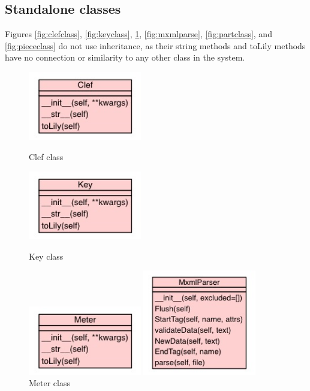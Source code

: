 \begin{appendices}
\subsection{Standalone classes}
Figures \ref{fig:clefclass}, \ref{fig:keyclass}, \ref{fig:meterclass}, \ref{fig:mxmlparse}, \ref{fig:partclass}, and \ref{fig:piececlass} do not use inheritance, as their string methods and toLily methods have no connection or similarity to any other class in the system.
\begin{figure}[H]
\begin{minipage}{160pt}
\includegraphics[width=140pt]{diagrams/jpegs/uml_class_diagram_for_implemen_2}
\caption{Clef class}
\label{fig:clefclass}
\end{minipage}	
\begin{minipage}{160pt}
	\includegraphics[width=140pt]{diagrams/jpegs/uml_class_diagram_for_implemen_28}
	\caption{Key class}
	\label{fig:keyclass}
\end{minipage}
\begin{minipage}{160pt}
	\includegraphics[width=140pt]{diagrams/jpegs/uml_class_diagram_for_implemen_45}
	\caption{Meter class}
	\label{fig:meterclass}
\end{minipage}
\begin{minipage}{160pt}
\includegraphics[width=140pt]{diagrams/jpegs/uml_class_diagram_for_implemen_46}	

\end{minipage}
\end{figure}
\end{appendices}

